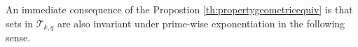 \documentclass[12pt]{amsart}
\newcommand{\F}{{\mathbb F}}
\newcommand{\PG}{\mathrm{PG}}
\newcommand{\rad}{\mathrm{rad}_q}
\begin{document}

An immediate consequence of the Propostion \ref{th:propertygeometricequiv} is that sets in $\mathcal{T}_{k,q}$ are also invariant under prime-wise exponentiation in the following sense.
\end{document}
